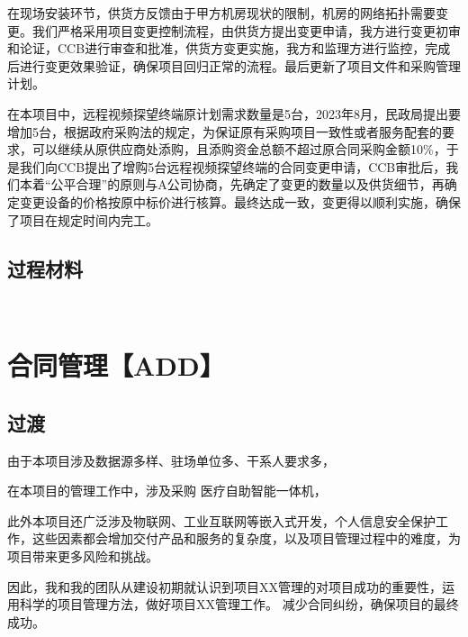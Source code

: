 \documentclass[UTF8]{../computerUniverse}
\begin{document}
在现场安装环节，供货方反馈由于甲方机房现状的限制，机房的网络拓扑需要变更。我们严格采用项目变更控制流程，由供货方提出变更申请，我方进行变更初审和论证，CCB进行审查和批准，供货方变更实施，我方和监理方进行监控，完成后进行变更效果验证，确保项目回归正常的流程。最后更新了项目文件和采购管理计划。


在本项目中，远程视频探望终端原计划需求数量是5台，2023年8月，民政局提出要增加5台，根据政府采购法的规定，为保证原有采购项目一致性或者服务配套的要求，可以继续从原供应商处添购，且添购资金总额不超过原合同采购金额10\%，于是我们向CCB提出了增购5台远程视频探望终端的合同变更申请，CCB审批后，我们本着“公平合理”的原则与A公司协商，先确定了变更的数量以及供货细节，再确定变更设备的价格按原中标价进行核算。最终达成一致，变更得以顺利实施，确保了项目在规定时间内完工。


\section{过程材料}

\begin{lstlisting}
   

\end{lstlisting}







\chapter{合同管理【ADD】}


\section{过渡}

由于本项目涉及数据源多样、驻场单位多、干系人要求多，

在本项目的管理工作中，涉及采购
医疗自助智能一体机，

此外本项目还广泛涉及物联网、工业互联网等嵌入式开发，个人信息安全保护工作，这些因素都会增加交付产品和服务的复杂度，以及项目管理过程中的难度，为项目带来更多风险和挑战。

因此，我和我的团队从建设初期就认识到项目XX管理的对项目成功的重要性，运用科学的项目管理方法，做好项目XX管理工作。
减少合同纠纷，确保项目的最终成功。
\end{document}
